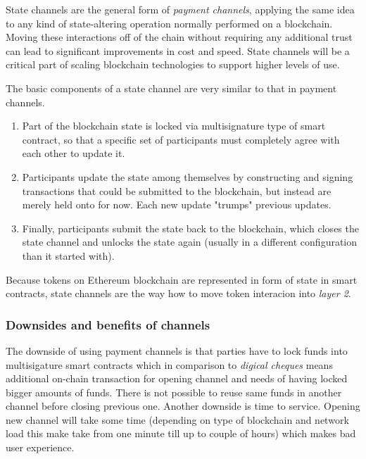 \documentclass[a4paper,12pt]{article}
\begin{document}
State channels are the general form of \textit{payment channels}, applying the
same idea to any kind of state-altering operation normally performed on a 
blockchain. Moving these interactions off of the chain without requiring any 
additional trust can lead to significant improvements in cost and speed. State 
channels will be a critical part of scaling blockchain technologies to support 
higher levels of use.

The basic components of a state channel are very similar to that in payment 
channels.

\begin{enumerate}
    \item Part of the blockchain state is locked via multisignature type of smart 
    contract, so that a specific set of participants must completely agree with 
    each other to update it.
    \item Participants update the state among themselves by constructing and 
    signing transactions that could be submitted to the blockchain, but instead 
    are merely held onto for now. Each new update "trumps" previous updates.
    \item Finally, participants submit the state back to the blockchain, which 
    closes the state channel and unlocks the state again (usually in a different 
    configuration than it started with).
\end{enumerate}

Because tokens on Ethereum blockchain are represented in form of state in smart 
contracts, state channels are the way how to move token interacion into 
\textit{layer 2}.\\

\subsubsection{Downsides and benefits of channels}

The downside of using payment channels is that parties have to lock funds into 
multisigature smart contracts which in comparison to \textit{digical cheques} 
means additional on-chain transaction for opening channel and needs of having 
locked bigger amounts of funds. There is not possible to reuse same funds in 
another channel before closing previous one. Another downside is time to 
service. Opening new channel will take some time (depending on type of 
blockchain and network load this make take from one minute till up to couple 
of hours) which makes bad user experience.\\
\end{document}
